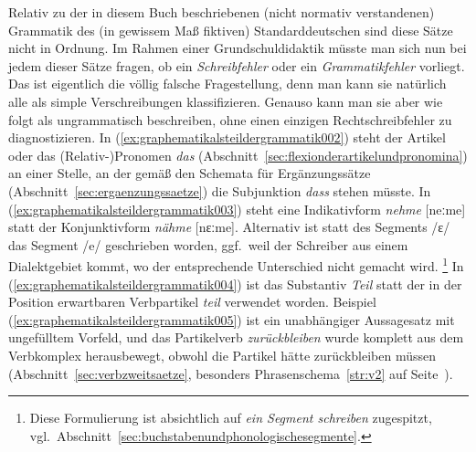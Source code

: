 \begin{exe}
  \ex\label{ex:graphematikalsteildergrammatik001}
  \begin{xlist}
  \end{xlist}
\end{exe}

Relativ zu der in diesem Buch beschriebenen (nicht normativ verstandenen) Grammatik des (in gewissem Maß fiktiven) Standarddeutschen sind diese Sätze nicht in Ordnung.
Im Rahmen einer Grundschuldidaktik müsste man sich nun bei jedem dieser Sätze fragen, ob ein \textit{Schreibfehler} oder ein \textit{Grammatikfehler} vorliegt.
Das ist eigentlich die völlig falsche Fragestellung, denn man kann sie natürlich alle als simple Verschreibungen klassifizieren.
Genauso kann man sie aber wie folgt als ungrammatisch beschreiben, ohne einen einzigen Rechtschreibfehler zu diagnostizieren.
In (\ref{ex:graphematikalsteildergrammatik002}) steht der Artikel oder das \mbox{(Relativ-)}Pronomen \textit{das} (Abschnitt~\ref{sec:flexionderartikelundpronomina}) an einer Stelle, an der gemäß den Schemata für Ergänzungssätze (Abschnitt~\ref{sec:ergaenzungssaetze}) die Subjunktion \textit{dass} stehen müsste.
In (\ref{ex:graphematikalsteildergrammatik003}) steht eine Indikativform \textit{nehme} [neːme] statt der Konjunktivform \textit{nähme} [nɛːme].
Alternativ ist statt des Segments /ɛ/ das Segment /e/ geschrieben worden, ggf.\ weil der Schreiber aus einem Dialektgebiet kommt, wo der entsprechende Unterschied nicht gemacht wird.%
\footnote{Diese Formulierung ist absichtlich auf \textit{ein Segment schreiben} zugespitzt, vgl.\ Abschnitt~\ref{sec:buchstabenundphonologischesegmente}.}
In (\ref{ex:graphematikalsteildergrammatik004}) ist das Substantiv \textit{Teil} statt der in der Position erwartbaren Verbpartikel \textit{teil} verwendet worden.
Beispiel (\ref{ex:graphematikalsteildergrammatik005}) ist ein unabhängiger Aussagesatz mit ungefülltem Vorfeld, und das Partikelverb \textit{zurückbleiben} wurde komplett aus dem Verbkomplex herausbewegt, obwohl die Partikel hätte zurückbleiben müssen (Abschnitt~\ref{sec:verbzweitsaetze}, besonders Phrasenschema~\ref{str:v2} auf Seite~\pageref{str:v2}).
